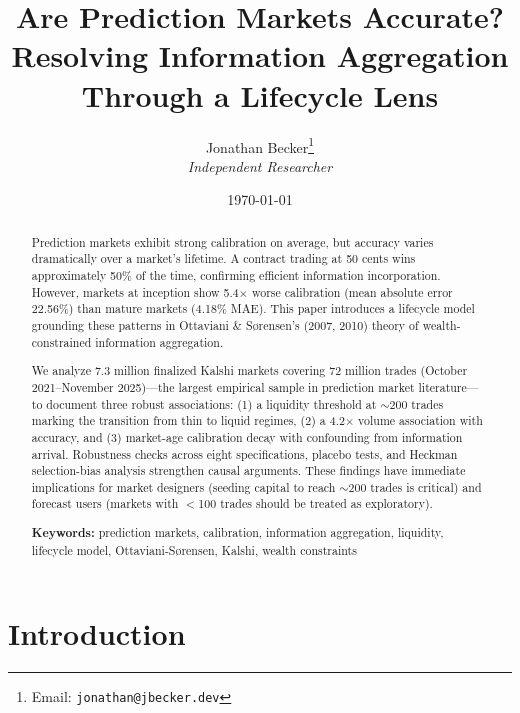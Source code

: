 \documentclass[a4paper,11pt]{article}
\title{\textbf{Are Prediction Markets Accurate? Resolving Information Aggregation Through a Lifecycle Lens}}
\author{Jonathan Becker\thanks{Email: \texttt{jonathan@jbecker.dev}} \\ \vspace{0.3cm} \textit{Independent Researcher}}
\date{\today}
\theoremstyle{plain}
\theoremstyle{definition}
\theoremstyle{remark}
\begin{document}

\maketitle

\begin{abstract}

Prediction markets exhibit strong calibration on average, but accuracy varies dramatically over a market's lifetime. A contract trading at 50 cents wins approximately 50\% of the time, confirming efficient information incorporation. However, markets at inception show 5.4$\times$ worse calibration (mean absolute error 22.56\%) than mature markets (4.18\% MAE). This paper introduces a lifecycle model grounding these patterns in Ottaviani \& Sørensen's (2007, 2010) theory of wealth-constrained information aggregation.

We analyze 7.3 million finalized Kalshi markets covering 72 million trades (October 2021--November 2025)---the largest empirical sample in prediction market literature---to document three robust associations: (1) a liquidity threshold at $\sim$200 trades marking the transition from thin to liquid regimes, (2) a 4.2$\times$ volume association with accuracy, and (3) market-age calibration decay with confounding from information arrival. Robustness checks across eight specifications, placebo tests, and Heckman selection-bias analysis strengthen causal arguments. These findings have immediate implications for market designers (seeding capital to reach $\sim$200 trades is critical) and forecast users (markets with $<$100 trades should be treated as exploratory).

\noindent\textbf{Keywords:} prediction markets, calibration, information aggregation, liquidity, lifecycle model, Ottaviani-Sørensen, Kalshi, wealth constraints

\end{abstract}

\newpage

\tableofcontents

\newpage


\section{Introduction}
\label{sec:intro}
\end{document}
